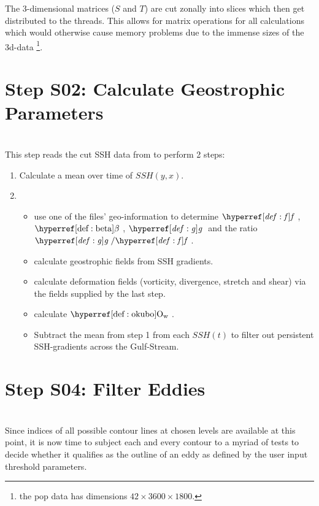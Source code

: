 The 3-dimensional matrices ($S$ and $T$) are cut zonally into slices which then get distributed to the threads. This allows for matrix operations for all calculations which would otherwise cause memory problems due to the immense sizes of the 3d-data \footnote{\Eg the pop data has dimensions $42 \times 3600 \times 1800 $.}.   


\section{Step S02: Calculate Geostrophic Parameters}
\\ 
This step reads the cut SSH data from  to perform 2 steps:
\begin{enumerate}
\item
Calculate a mean over time of $SSH(y,x)$.
	\item 
\begin{itemize}
	\item  use one of the files' geo-information to determine $\f$, $\dfdy$,
$\g$ and the ratio $\g/\f$.
\item
 calculate geostrophic fields from SSH gradients.
 \item
 calculate deformation fields (vorticity, divergence, stretch and shear) via the
fields supplied by the last step.
\item calculate $\okubo$.
\item
Subtract the mean from step 1 from each $SSH(t)$ to filter out persistent SSH-gradients \eg across the Gulf-Stream.
\end{itemize}


\end{enumerate}

\section{Step S04: Filter Eddies} \label{S:04}
\\ 
Since indices of all possible contour lines at chosen levels are available at
this point, it is now time to subject each and every contour to a
myriad of tests to decide whether it qualifies as the outline of an eddy as
defined by the user input threshold parameters.
